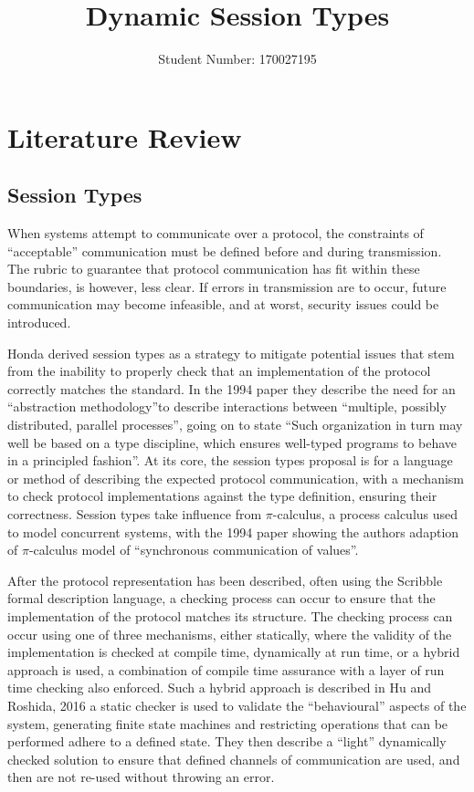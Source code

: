 \documentclass{article}
\author{Student Number: 170027195}
\title{Dynamic Session Types}
\begin{document}
	\maketitle
	\pagebreak
	\tableofcontents
	\pagebreak
	\section{Literature Review}
	\subsection{Session Types} \label{session types}
	When systems attempt to communicate over a protocol, the constraints of “acceptable” communication must be defined before and during transmission. The rubric to guarantee that protocol communication has fit within these boundaries, is however, less clear. If errors in transmission are to occur, future communication may become infeasible, and at worst, security issues could be introduced.
	
	Honda derived session types\cite{honda1993types, takeuchi1994interaction, honda1998language} as a strategy to mitigate potential issues that stem from the inability to properly check that an implementation of the protocol correctly matches the standard. In the 1994 paper\cite{takeuchi1994interaction} they describe the need for an ``abstraction methodology''to describe interactions between ``multiple, possibly distributed, parallel	processes'', going on to state ``Such organization in turn may well be based on a type discipline, which ensures well-typed programs to behave in a principled fashion''. At its core, the session types proposal is for a language or method of describing the expected protocol communication, with a mechanism to check protocol implementations against the type definition, ensuring their correctness. 	Session types take influence from $\pi$-calculus\cite{milner1999communicating}, a process calculus used to model concurrent systems, with the 1994 paper\cite{takeuchi1994interaction} showing the authors adaption of $\pi$-calculus model of ``synchronous communication of values''.
	
	After the protocol representation has been described, often using the Scribble formal description language\cite{honda2011scribbling}, a checking process can occur to ensure that the implementation of the protocol matches its structure. The checking process can occur using one of three mechanisms, either statically, where the validity of the implementation is checked at compile time, dynamically at run time, or a hybrid approach is used, a combination of compile time assurance with a layer of run time checking also enforced. Such a hybrid approach is described in Hu and Roshida, 2016\cite{hu2016hybrid} a static checker is used to validate the ``behavioural'' aspects of the system, generating finite state machines and restricting operations that can be performed adhere to a defined state. They then describe a ``light'' dynamically checked solution to ensure that defined channels of communication are used, and then are not re-used without throwing an error.
	
\end{document}
